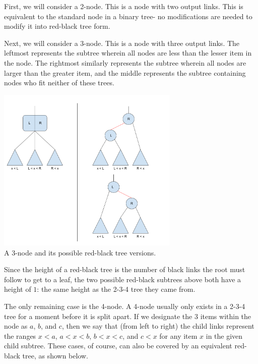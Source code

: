 \documentclass[12pt]{amsart}
\begin{document}
    First, we will consider a 2-node. This is a node with two
    output links. This is equivalent to the standard node in a
    binary tree- no modifications are needed to modify it into
    red-black tree form.

    Next, we will consider a 3-node. This is a node with three
    output links. The leftmost represents the subtree wherein
    all nodes are less than the lesser item in the node. The
    rightmost similarly represents the subtree wherein all nodes
    are larger than the greater item, and the middle represents
    the subtree containing nodes who fit neither of these trees.

\begin{center}
    \includegraphics[width=0.65\textwidth]{rb_tree_1} \\
    A 3-node and its possible red-black tree versions. \\
    \vskip 1cm
\end{center}

    Since the height of a red-black tree is the number of black
    links the root must follow to get to a leaf, the two
    possible red-black subtrees above both have a height of $1$:
    the same height as the 2-3-4 tree they came from.

    The only remaining case is the 4-node. A 4-node usually only
    exists in a 2-3-4 tree for a moment before it is split
    apart. If we designate the $3$ items within the node as
    $a$, $b$, and $c$, then we say that (from left to right) the
    child links represent the ranges $x < a$, $a < x < b$,
    $b < x < c$, and $c < x$ for any item $x$ in the given
    child subtree. These cases, of course, can also be covered
    by an equivalent red-black tree, as shown below.
\end{document}
